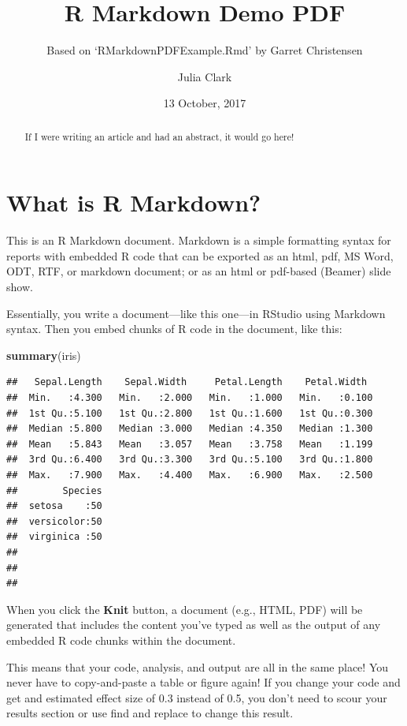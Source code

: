 \documentclass[11pt,]{article}
\title{R Markdown Demo PDF}
\subtitle{Based on `RMarkdownPDFExample.Rmd' by Garret Christensen}
\author{Julia Clark}
\date{13 October, 2017}
\newenvironment{Shaded}{\begin{snugshade}}{\end{snugshade}}
\newcommand{\KeywordTok}[1]{\textcolor[rgb]{0.13,0.29,0.53}{\textbf{{#1}}}}
\newcommand{\NormalTok}[1]{{#1}}
\begin{document}
\maketitle
\begin{abstract}
If I were writing an article and had an abstract, it would go here!
\end{abstract}

\section{What is R Markdown?}\label{what-is-r-markdown}

This is an R Markdown document. Markdown is a simple formatting syntax
for reports with embedded R code that can be exported as an html, pdf,
MS Word, ODT, RTF, or markdown document; or as an html or pdf-based
(Beamer) slide show.

Essentially, you write a document---like this one---in RStudio using
Markdown syntax. Then you embed chunks of R code in the document, like
this:

\begin{Shaded}
\begin{Highlighting}[]
\KeywordTok{summary}\NormalTok{(iris)}
\end{Highlighting}
\end{Shaded}

\begin{verbatim}
##   Sepal.Length    Sepal.Width     Petal.Length    Petal.Width   
##  Min.   :4.300   Min.   :2.000   Min.   :1.000   Min.   :0.100  
##  1st Qu.:5.100   1st Qu.:2.800   1st Qu.:1.600   1st Qu.:0.300  
##  Median :5.800   Median :3.000   Median :4.350   Median :1.300  
##  Mean   :5.843   Mean   :3.057   Mean   :3.758   Mean   :1.199  
##  3rd Qu.:6.400   3rd Qu.:3.300   3rd Qu.:5.100   3rd Qu.:1.800  
##  Max.   :7.900   Max.   :4.400   Max.   :6.900   Max.   :2.500  
##        Species  
##  setosa    :50  
##  versicolor:50  
##  virginica :50  
##                 
##                 
## 
\end{verbatim}

When you click the \textbf{Knit} button, a document (e.g., HTML, PDF)
will be generated that includes the content you've typed as well as the
output of any embedded R code chunks within the document.

This means that your code, analysis, and output are all in the same
place! You never have to copy-and-paste a table or figure again! If you
change your code and get and estimated effect size of 0.3 instead of
0.5, you don't need to scour your results section or use find and
replace to change this result.
\end{document}
